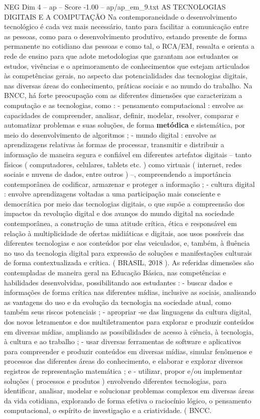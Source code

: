 \begin{textsample}{NEG Dim 4 – ap – Score -1.00 – ap/ap\_em\_9.txt}  \label{ex:f4_neg_058}
AS TECNOLOGIAS DIGITAIS E A COMPUTAÇÃO Na contemporaneidade o desenvolvimento tecnológico é cada vez mais necessário, tanto para facilitar a comunicação entre as pessoas, como para o desenvolvimento produtivo, estando presente de forma permanente no cotidiano das pessoas e como tal, o RCA/EM, ressalta e orienta a rede de ensino para que adote metodologias que garantam aos estudantes os estudos, vivências e o aprimoramento de conhecimentos que estejam articulados às competências gerais, no aspecto das potencialidades das tecnologias digitais, nas diversas áreas do conhecimento, práticas sociais e ao mundo do trabalho.
Na BNCC, há forte preocupação com as diferentes dimensões que caracterizam a computação e as tecnologias, como : - pensamento computacional : envolve as capacidades de compreender, analisar, definir, modelar, resolver, comparar e automatizar problemas e suas soluções, de forma \textbf{metódica} e sistemática, por meio do desenvolvimento de algoritmos ; - mundo digital : envolve as aprendizagens relativas às formas de processar, transmitir e distribuir a informação de maneira segura e confiável em diferentes artefatos digitais – tanto físicos ( computadores, celulares, tablets etc. ) como virtuais ( internet, redes sociais e nuvens de dados, entre outros ) –, compreendendo a importância contemporânea de codificar, armazenar e proteger a informação ; - cultura digital : envolve aprendizagens voltadas a uma participação mais consciente e democrática por meio das tecnologias digitais, o que supõe a compreensão dos impactos da revolução digital e dos avanços do mundo digital na sociedade contemporânea, a construção de uma atitude crítica, ética e responsável em relação à multiplicidade de ofertas midiáticas e digitais, aos usos possíveis das diferentes tecnologias e aos conteúdos por elas veiculados, e, também, à fluência no uso da tecnologia digital para expressão de soluções e manifestações culturais de forma contextualizada e crítica. ( BRASIL, 2018 ).
As referidas dimensões são contempladas de maneira geral na Educação Básica, nas competências e habilidades desenvolvidas, possibilitando aos estudantes : - buscar dados e informações de forma crítica nas diferentes mídias, inclusive as sociais, analisando as vantagens do uso e da evolução da tecnologia na sociedade atual, como também seus riscos potenciais ; - apropriar -se das linguagens da cultura digital, dos novos letramentos e dos multiletramentos para explorar e produzir conteúdos em diversas mídias, ampliando as possibilidades de acesso à ciência, à tecnologia, à cultura e ao trabalho ; - usar diversas ferramentas de software e aplicativos para compreender e produzir conteúdos em diversas mídias, simular fenômenos e processos das diferentes áreas do conhecimento, e elaborar e explorar diversos registros de representação matemática ; e - utilizar, propor e/ou implementar soluções ( processos e produtos ) envolvendo diferentes tecnologias, para identificar, analisar, modelar e solucionar problemas complexos em diversas áreas da vida cotidiana, explorando de forma efetiva o raciocínio lógico, o pensamento computacional, o espírito de investigação e a criatividade. ( BNCC.

\end{textsample}
